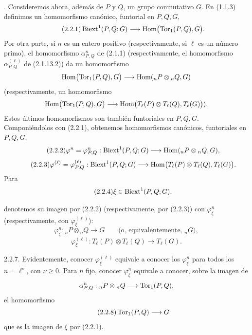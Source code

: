 \par\medskip{}. Consideremos ahora, además de $P$ y $Q$, un grupo conmutativo
$G$. En (1.1.3) definimos un homomorfismo canónico, funtorial en
$P,Q,G$,
\begin{equation}\tag{2.2.1}
 \operatorname{Biext}^1(P,Q;G)
 \longrightarrow
 \operatorname{Hom}\bigl(\operatorname{Tor}_1(P,Q),G\bigr).
\end{equation}
Por otra parte, si $n$ es un entero positivo (respectivamente, si
$\ell$ es un número primo), el homomorfismo $\alpha^n_{P,Q}$ de
(2.1.1) (respectivamente, el homomorfismo $\alpha^{(\ell)}_{P,Q}$ de
(2.1.13.2)) da un homomorfismo
\[
 \operatorname{Hom}\bigl(\operatorname{Tor}_1(P,Q),G\bigr)
 \longrightarrow
 \operatorname{Hom}({}_nP\otimes{}_nQ,G)
\]
(respectivamente, un homomorfismo
\[
 \operatorname{Hom}\bigl(\operatorname{Tor}_1(P,Q),G\bigr)
 \longrightarrow
 \operatorname{Hom}\bigl(T_\ell(P)\otimes T_\ell(Q),T_\ell(G)\bigr)).
\]
Estos últimos homomorfismos son también funtoriales en $P,Q,G$.
Componiéndolos con (2.2.1), obtenemos homomorfismos canónicos,
funtoriales en $P,Q,G$,
\begin{equation}\tag{2.2.2}
 \varphi^n=\varphi^n_{P,Q}:
 \operatorname{Biext}^1(P,Q;G)
 \longrightarrow
 \operatorname{Hom}({}_nP\otimes{}_nQ,G),
\end{equation}
\begin{equation}\tag{2.2.3}
 \varphi^{(\ell)}=\varphi^{(\ell)}_{P,Q}:
 \operatorname{Biext}^1(P,Q;G)
 \longrightarrow
 \operatorname{Hom}\bigl(T_\ell(P)\otimes T_\ell(Q),T_\ell(G)\bigr).
\end{equation}
Para
\begin{equation}\tag{2.2.4}
 \xi\in\operatorname{Biext}^1(P,Q;G),
\end{equation}


denotemos su imagen por (2.2.2) (respectivamente, por (2.2.3)) con
$\varphi^n_\xi$ (respectivamente, con $\varphi^{(\ell)}_\xi$):
\begin{equation}\tag{2.2.5}
 \varphi^n_\xi:{}_nP\otimes{}_nQ
 \longrightarrow G
 \qquad\text{(o, equivalentemente, }{}_nG\text{)},
\end{equation}
\begin{equation}\tag{2.2.6}
 \varphi^{(\ell)}_\xi:
 T_\ell(P)\otimes T_\ell(Q)
 \longrightarrow T_\ell(G).
\end{equation}

2.2.7. Evidentemente, conocer $\varphi^{(\ell)}_\xi$ equivale a
conocer los $\varphi^n_\xi$ para todos los $n=\ell^\nu$, con
$\nu\geq0$. Para $n$ fijo, conocer $\varphi^n_\xi$ equivale a conocer,
sobre la imagen de
\[
 \sisi{\varphi^n_{P,Q}:{}_nP\otimes{}_nQ
 \longrightarrow\uTor_1(P,Q;G)}%
 {\alpha^n_{P,Q}:{}_nP\otimes{}_nQ
 \longrightarrow\uTor_1(P,Q)},
\]
el homomorfismo
\begin{equation}\tag{2.2.8}
 \operatorname{Tor}_1(P,Q)\longrightarrow G
\end{equation}
que es la imagen de $\xi$ por (2.2.1).

